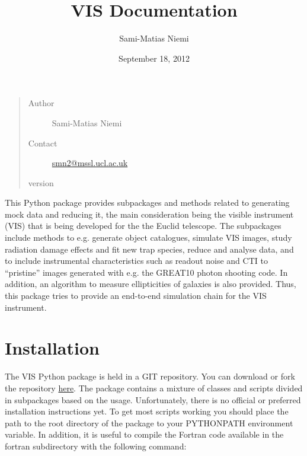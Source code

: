 \documentclass[a4paper,12pt,english]{sphinxmanual}
\title{VIS Documentation}
\date{September 18, 2012}
\author{Sami-Matias Niemi}
\begin{document}
\maketitle
\tableofcontents
{}\label{index::doc}

\begin{quote}\begin{description}
\item[{Author}] \leavevmode
Sami-Matias Niemi

\item[{Contact}] \leavevmode
\href{mailto:smn2@mssl.ucl.ac.uk}{smn2@mssl.ucl.ac.uk}

\item[{version}] 

\end{description}\end{quote}

This Python package provides subpackages and methods related to generating mock data and reducing it, the main
consideration being the visible instrument (VIS) that is being developed for the
the Euclid telescope. The subpackages include methods to e.g. generate object catalogues, simulate VIS images,
study radiation damage effects and fit new trap species, reduce and analyse data, and to include instrumental
characteristics such as readout noise and CTI to ``pristine'' images generated with e.g. the GREAT10 photon
shooting code. In addition, an algorithm to measure ellipticities of galaxies is also provided. Thus,
this package tries to provide an end-to-end simulation chain for the VIS instrument.


\chapter{Installation}
\label{index:installation}\label{index:welcome-to-euclid-visible-instrument-vis-python-package-documentation}
The VIS Python package is held in a GIT repository. You can download or fork the repository
\href{https://bitbucket.org/niemi/vissim-python/overview}{here}. The package contains a mixture of classes
and scripts divided in subpackages based on the usage. Unfortunately, there is no official or preferred
installation instructions yet. To get most scripts working you should place
the path to the root directory of the package to your PYTHONPATH environment variable. In addition, it is
useful to compile the Fortran code available in the fortran subdirectory with the following command:
\end{document}
